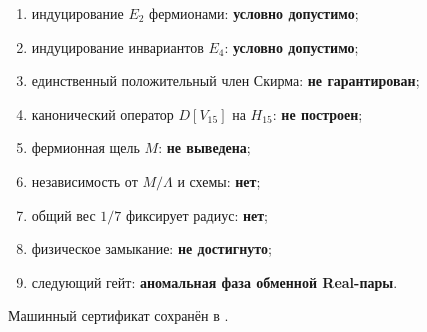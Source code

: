 \begin{protocol}
\begin{enumerate}
 \item индуцирование $E_2$ фермионами: \textbf{условно допустимо};
 \item индуцирование инвариантов $E_4$: \textbf{условно допустимо};
 \item единственный положительный член Скирма: \textbf{не гарантирован};
 \item канонический оператор $D[V_{15}]$ на $H_{15}$:
 \textbf{не построен};
 \item фермионная щель $M$: \textbf{не выведена};
 \item независимость от $M/\Lambda$ и схемы: \textbf{нет};
 \item общий вес $1/7$ фиксирует радиус: \textbf{нет};
 \item физическое замыкание: \textbf{не достигнуто};
 \item следующий гейт: \textbf{аномальная фаза обменной Real-пары}.
\end{enumerate}
\end{protocol}

Машинный сертификат сохранён в
.